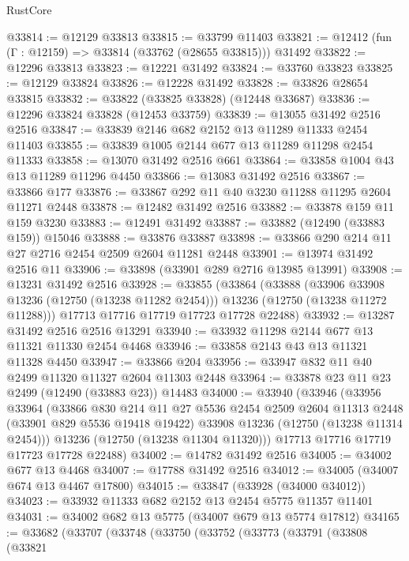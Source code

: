 \begin{lexlean}{RustCore}
\begin{coremodule}
@33814 := @12129 @33813
@33815 := @33799 @11403
@33821 := @12412 (fun (Γ : @12159) => @33814 (@33762 (@28655 @33815))) @31492
@33822 := @12296 @33813
@33823 := @12221 @31492
@33824 := @33760 @33823
@33825 := @12129 @33824
@33826 := @12228 @31492
@33828 := @33826 @28654 @33815
@33832 := @33822 (@33825 @33828) (@12448 @33687)
@33836 := @12296 @33824 @33828 (@12453 @33759)
@33839 := @13055 @31492 @2516 @2516
@33847 := @33839 @2146 @682 @2152 @13 @11289 @11333 @2454 @11403
@33855 := @33839 @1005 @2144 @677 @13 @11289 @11298 @2454 @11333
@33858 := @13070 @31492 @2516 @661
@33864 := @33858 @1004 @43 @13 @11289 @11296 @4450
@33866 := @13083 @31492 @2516
@33867 := @33866 @177
@33876 := @33867 @292 @11 @40 @3230 @11288 @11295 @2604 @11271 @2448
@33878 := @12482 @31492 @2516
@33882 := @33878 @159 @11 @159 @3230
@33883 := @12491 @31492
@33887 := @33882 (@12490 (@33883 @159)) @15046
@33888 := @33876 @33887
@33898 := @33866 @290 @214 @11 @27 @2716 @2454 @2509 @2604 @11281 @2448
@33901 := @13974 @31492 @2516 @11
@33906 := @33898 (@33901 @289 @2716 @13985 @13991)
@33908 := @13231 @31492 @2516
@33928 := @33855
    (@33864
      (@33888
        (@33906 @33908 @13236 (@12750 (@13238 @11282 @2454)))
        @13236
        (@12750 (@13238 @11272 @11288)))
      @17713
      @17716
      @17719
      @17723
      @17728
      @22488)
@33932 := @13287 @31492 @2516 @2516 @13291
@33940 := @33932 @11298 @2144 @677 @13 @11321 @11330 @2454 @4468
@33946 := @33858 @2143 @43 @13 @11321 @11328 @4450
@33947 := @33866 @204
@33956 := @33947 @832 @11 @40 @2499 @11320 @11327 @2604 @11303 @2448
@33964 := @33878 @23 @11 @23 @2499 (@12490 (@33883 @23)) @14483
@34000 := @33940
    (@33946
      (@33956
        @33964
        (@33866
          @830
          @214
          @11
          @27
          @5536
          @2454
          @2509
          @2604
          @11313
          @2448
          (@33901 @829 @5536 @19418 @19422)
          @33908
          @13236
          (@12750 (@13238 @11314 @2454)))
        @13236
        (@12750 (@13238 @11304 @11320)))
      @17713
      @17716
      @17719
      @17723
      @17728
      @22488)
@34002 := @14782 @31492 @2516
@34005 := @34002 @677 @13 @4468
@34007 := @17788 @31492 @2516
@34012 := @34005 (@34007 @674 @13 @4467 @17800)
@34015 := @33847 (@33928 (@34000 @34012))
@34023 := @33932 @11333 @682 @2152 @13 @2454 @5775 @11357 @11401
@34031 := @34002 @682 @13 @5775 (@34007 @679 @13 @5774 @17812)
@34165 := @33682
    (@33707
      (@33748
        (@33750
          (@33752
            (@33773
              (@33791
                (@33808
                  (@33821

\end{coremodule}
\end{lexlean}
